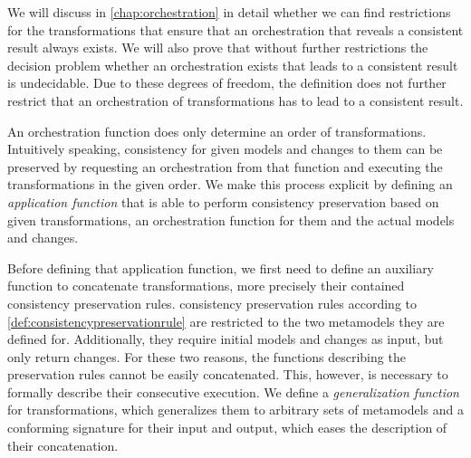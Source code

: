 We will discuss in \autoref{chap:orchestration} in detail whether we can find restrictions for the transformations that ensure that an orchestration that reveals a consistent result always exists.
We will also prove that without further restrictions the decision problem whether an orchestration exists that leads to a consistent result is undecidable.
Due to these degrees of freedom, the definition does not further restrict that an orchestration of transformations has to lead to a consistent result.

An \gls{orchestration function} does only determine an order of transformations.
Intuitively speaking, consistency for given models and changes to them can be preserved by requesting an orchestration from that function and executing the transformations in the given order.
We make this process explicit by defining an \emph{\gls{application function}} that is able to perform consistency preservation based on given transformations, an orchestration function for them and the actual models and changes.

Before defining that \gls{application function}, we first need to define an auxiliary function to concatenate transformations, more precisely their contained \glspl{consistency preservation rule}.
\Glspl{consistency preservation rule} according to \autoref{def:consistencypreservationrule} are restricted to the two metamodels they are defined for.
Additionally, they require initial models and changes as input, but only return changes.
For these two reasons, the functions describing the preservation rules cannot be easily concatenated.
This, however, is necessary to formally describe their consecutive execution.
We define a \emph{generalization function} for transformations, which generalizes them to arbitrary sets of metamodels and a conforming signature for their input and output, which eases the description of their concatenation.

